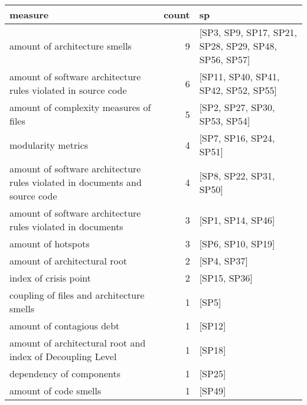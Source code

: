 \begin{tabular}{lrl}
\toprule
                                                                     measure &  count &                                                    sp \\
\midrule
                                               amount of architecture smells &      9 &  [SP3, SP9, SP17, SP21, SP28, SP29, SP48, SP56, SP57] \\
               amount of software architecture rules violated in source code &      6 &                  [SP11, SP40, SP41, SP42, SP52, SP55] \\
                                      amount of complexity measures of files &      5 &                         [SP2, SP27, SP30, SP53, SP54] \\
                                                          modularity metrics &      4 &                               [SP7, SP16, SP24, SP51] \\
 amount of software architecture rules violated in documents and source code &      4 &                               [SP8, SP22, SP31, SP50] \\
                 amount of software architecture rules violated in documents &      3 &                                     [SP1, SP14, SP46] \\
                                                          amount of hotspots &      3 &                                     [SP6, SP10, SP19] \\
                                                amount of architectural root &      2 &                                           [SP4, SP37] \\
                                                       index of crisis point &      2 &                                          [SP15, SP36] \\
                                   coupling of files and architecture smells &      1 &                                                 [SP5] \\
                                                   amount of contagious debt &      1 &                                                [SP12] \\
                  amount of architectural root and index of Decoupling Level &      1 &                                                [SP18] \\
                                                    dependency of components &      1 &                                                [SP25] \\
                                                       amount of code smells &      1 &                                                [SP49] \\
\bottomrule
\end{tabular}
